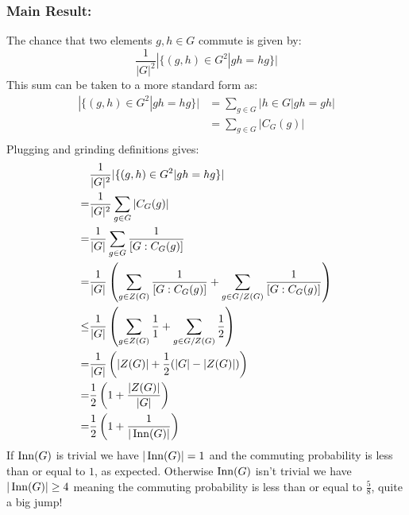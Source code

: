 \subsubsection{Main Result:}
The chance that two elements $g,h\in G$ commute is given by:
\[\frac{1}{|G|^2}|\{(g,h)\in G^2 | gh=hg\}|\]
This sum can be taken to a more standard form as:
\[\begin{aligned}
	|\{(g,h)\in G^2 | gh=hg\}| &= \sum_{g\in G}|{h\in G| gh=gh}|\\
	&= \sum_{g\in G}|C_G(g)|\\
\end{aligned}\]
Plugging and grinding definitions gives:
\[\begin{aligned}
	&\frac{1}{|G|^2}|\{(g,h)\in G^2 | gh=hg\}|\\
	=& \frac{1}{|G|^2}\sum_{g\in G}|C_G(g)| \\
	=& \frac{1}{|G|}\sum_{g\in G}\frac{1}{[G:C_G(g)]} \\
	=& \frac{1}{|G|}\left(\sum_{g\in Z(G)}\frac{1}{[G:C_G(g)]}+\sum_{g\in G/Z(G)}\frac{1}{[G:C_G(g)]}\right) \\
	\leq& \frac{1}{|G|}\left(\sum_{g\in Z(G)}\frac{1}{1}+\sum_{g\in G/Z(G)}\frac{1}{2}\right) \\
	=& \frac{1}{|G|}\left(|Z(G)|+\frac{1}{2}(|G|-|Z(G)|)\right) \\
	=& \frac{1}{2}\left(1+\frac{|Z(G)|}{|G|}\right) \\
	=& \frac{1}{2}\left(1+\frac{1}{|\operatorname{Inn}(G)|}\right) \\
\end{aligned}\]
If $\operatorname{Inn}(G)$ is trivial we have $|\operatorname{Inn}(G)|=1$ and the commuting probability is less than or equal to $1$,
as expected.
Otherwise $\operatorname{Inn}(G)$ isn't trivial we have $|\operatorname{Inn}(G)|\geq 4$ meaning the commuting probability is less than or equal to $\frac{5}{8}$,
quite a big jump!
